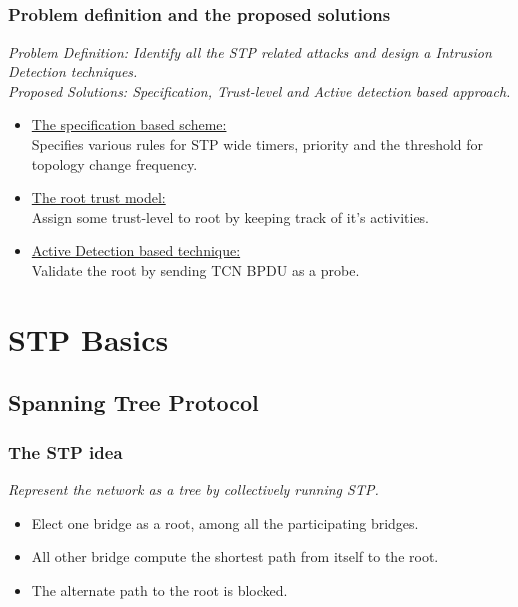 \documentclass[10pt, blue,subsection=true, compress]{beamer}
\begin{document}
\subsection*{}
\begin{frame} \frametitle{Problem definition and the proposed solutions }
\emph{ Problem Definition: Identify all the STP related attacks and design a \hspace{8 mm} Intrusion Detection techniques.} \\

\vspace{2 mm}
\emph{Proposed Solutions: Specification, Trust-level and Active detection based \hspace{8 mm} approach.}
\pause
\begin{itemize}
\item \underline{The specification based scheme: }
  \\ \hspace{8 mm} Specifies various rules for STP wide timers, priority and the threshold 
   for topology change frequency.
\pause
\item \underline{The root trust model: }
 \\ \hspace{8 mm} Assign some trust-level to root by keeping track of it's activities.
   
\item \underline{Active Detection based technique: }
 \\ \hspace{8 mm} Validate the root by sending TCN BPDU as a probe.
  \end{itemize}                               
\end{frame} 
\section{STP Basics}

\subsection*{Spanning Tree Protocol}
\begin{frame} \frametitle{The STP idea }
\emph{\SpecialCoor Represent the network as a tree by collectively running STP.}
\vspace{8 mm}
\begin{itemize}
\item  Elect one bridge as a root, among all the participating bridges.\\

 \item All other bridge compute the shortest path from itself to the root.\\

 \item The alternate path to the root is blocked.
 \end{itemize}

\end{frame} 
\end{document}
